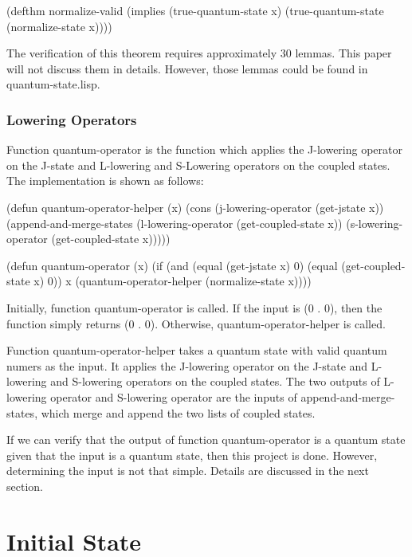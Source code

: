 \documentclass[12pt,journal,compsoc]{IEEEtran}
\begin{document}
\begin{acl2-lst}
(defthm normalize-valid
 (implies (true-quantum-state x)
  (true-quantum-state (normalize-state x))))
\end{acl2-lst}

The verification of this theorem requires approximately 30 lemmas. This paper will not discuss them in details. However, those lemmas could be found in quantum-state.lisp.

\subsubsection{Lowering Operators}

Function quantum-operator is the function which applies the J-lowering operator on the J-state and L-lowering and S-Lowering operators on the coupled states. The implementation is shown as follows:

\begin{acl2-lst}
(defun quantum-operator-helper (x)
 (cons (j-lowering-operator (get-jstate x))
  (append-and-merge-states 
   (l-lowering-operator (get-coupled-state x))
   (s-lowering-operator (get-coupled-state x)))))

(defun quantum-operator (x)
 (if (and (equal (get-jstate x) 0)
      (equal (get-coupled-state x) 0))
  x
  (quantum-operator-helper (normalize-state x))))
\end{acl2-lst}

Initially, function quantum-operator is called. If the input is (0 . 0), then the function simply returns (0 . 0). Otherwise, quantum-operator-helper is called.

Function quantum-operator-helper takes a quantum state with valid quantum numers as the input. It applies the J-lowering operator on the J-state and L-lowering and S-lowering operators on the coupled states. The two outputs of L-lowering operator and S-lowering operator are the inputs of append-and-merge-states, which merge and append the two lists of coupled states.

If we can verify that the output of function quantum-operator is a quantum state given that the input is a quantum state, then this project is done. However, determining the input is not that simple. Details are discussed in the next section.


\section{Initial State}
\end{document}
